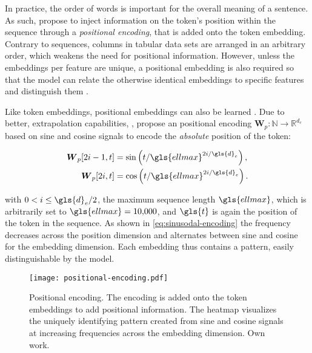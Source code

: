 In practice, the order of words is important for the overall meaning of a sentence. As such, \textcite[][6]{vaswaniAttentionAllYou2017} propose to inject information on the token's position within the sequence through a \emph{positional encoding}, that is added onto the token embedding. Contrary to sequences, columns in tabular data sets are arranged in an arbitrary order, which weakens the need for positional information. However, unless the embeddings per feature are unique, a positional embedding is also required so that the model can relate the otherwise identical embeddings to specific features and distinguish them \autocites[][3]{huangTabTransformerTabularData2020}[][15]{somepalliSAINTImprovedNeural2021}.

Like token embeddings, positional embeddings can also be learned \autocite[cp.][4174]{devlinBERTPretrainingDeep2019}. Due to better, extrapolation capabilities, \textcite[][6]{vaswaniAttentionAllYou2017}, propose an positional encoding $\boldsymbol{W}_p: \mathbb{N} \rightarrow \mathbb{R}^{d_{e}}$ based on sine and cosine signals to encode the \emph{absolute} position of the token:

\begin{equation}
\begin{aligned}
\boldsymbol{W}_p[2 i-1, t] & =\sin \left(t / \gls{ellmax}^{2 i / \gls{d}_e}\right), \\
\boldsymbol{W}_p[2 i, t] & =\cos \left(t / \gls{ellmax}^{2 i / \gls{d}_e}\right).
\end{aligned}
\label{eq:sinusodal-encoding}
\end{equation}

with $0<i \leq \gls{d}_{e} / 2$, the maximum sequence length $\gls{ellmax}$, which is arbitrarily set to $\gls{ellmax}=10{,}000$, and $\gls{t}$ is again the position of the token in the sequence. As shown in \cref{eq:sinusodal-encoding} the frequency decreases across the position dimension and alternates between sine and cosine for the embedding dimension. Each embedding thus contains a pattern, easily distinguishable by the model.

\begin{figure}[ht]
\centering
\texttt{[image: positional-encoding.pdf]}
\caption[Positional Encoding]{Positional encoding. The encoding is added onto the token embeddings to add positional information. The heatmap visualizes the uniquely identifying pattern created from sine and cosine signals at increasing frequencies across the embedding dimension. Own work.}
\label{fig:positional-embedding}
\end{figure}

